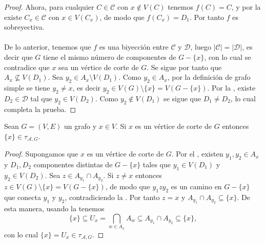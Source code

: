 \begin{proof}
   Ahora, para cualquier $C\in\mathcal{C}$ con $x\notin V(C)$ tenemos $f(C)=C$, y por la  existe $C_x\in \mathcal{C}$ con $x\in V(C_x)$, de modo que $f(C_x)=D_1$. Por tanto $f$ es sobreyectiva.\\\\
   De lo anterior, tenemos que $f$ es una biyección entre $\mathcal{C}$ y $\mathcal{D}$, luego $|\mathcal{C}|=|\mathcal{D}|$, es decir que $G$ tiene el mismo número de componentes de $G-\{x\}$, con lo cual se contradice que $x$ sea un vértice de corte de $G$. Se sigue por tanto que $A_x\nsubseteq V(D_1)$. Sea $y_2\in A_x\setminus V(D_1)$. Como $y_2\in A_x$, por la definición de grafo simple se tiene $y_2\ne x$, es decir $y_2\in V(G)\setminus\{x\}=V(G-\{x\})$. Por la , existe $D_2\in\mathcal{D}$ tal que $y_2\in V(D_2)$. Como $y_2\notin V(D_1)$ se sigue que $D_1\ne D_2$, lo cual completa la prueba.
\end{proof}
\begin{Prop}
   Sean $G=(V,E)$ un grafo y $x\in V$. Si $x$ es un vértice de corte de $G$ entonces $\{x\}\in\tau_{\mathcal{A},G}$.
\end{Prop}
\begin{proof}
   Supongamos que $x$ es un vértice de corte de $G$. Por el , existen $y_1,y_2\in A_x$ y $D_1,D_2$ componentes distintas de $G-\{x\}$ tales que $y_1\in V(D_1)$ y $y_2\in V(D_2)$. Sea $z\in A_{y_1}\cap A_{y_2}$. Si $z\ne x$ entonces $z\in V(G)\setminus \{x\}=V(G-\{x\})$, de modo que $y_1zy_2$ es un camino en $G-\{x\}$ que conecta $y_1$ y $y_2$, contradiciendo la . Por tanto $z=x$ y $A_{y_1}\cap A_{y_2}\subseteq \{x\}$. De esta manera, usando la  tenemos
   $$
   \{x\}\subseteq U_x=\bigcap_{w\in A_x}A_w\subseteq A_{y_1}\cap A_{y_2}\subseteq \{x\},
   $$
   con lo cual $\{x\}=U_x\in \tau_{\mathcal{A},G}$.
\end{proof}
